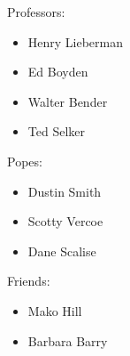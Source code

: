 Professors:

\begin{itemize}
\item{Henry Lieberman}
\item{Ed Boyden}
\item{Walter Bender}
\item{Ted Selker}
\end{itemize}

Popes:

\begin{itemize}
\item{Dustin Smith}
\item{Scotty Vercoe}
\item{Dane Scalise}
\end{itemize}

Friends:

\begin{itemize}
\item{Mako Hill}
\item{Barbara Barry}
\end{itemize}

\endgroup

